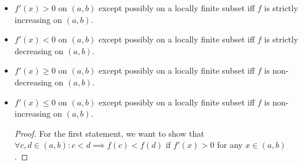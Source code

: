 \documentclass[a4paper,12pt]{report}
\begin{document}
\begin{itemize}
\begin{itemize}
If $f'(x)\geq g'(x)$ for all $x\in (a,b)$ with $b\in\bbR_{>a}\cup\{\infty\}$, and $f(a)=g(a)$, then $f(x)\geq g(x)$ for all $x\in(a,b]$.

If $f'(x)\geq g'(x)$ for all $x\in (a,b)$ with $b\in\bbR_{>a}\cup\{\infty\}$, $f$ is continuous on $(a,b]$, and $f(a)=g(a)$, then $f(x)\geq g(x)$ for all $x\in(a,b]$.
\begin{proof}
    For the first and second statements, define a function
    \[h(x)=f(x)-g(x).\]
    \[h'(x)=f'(x)-g'(x)>0,\quad\forall x\in(a,b).\]
    \[h(a)=f(a)-g(a)=0.\]
    By MVT, for all $x\in(a,b)$ for the first statement and $x\in(a,b]$ for the second statement, there exists $c\in(a,x)$ such that
    \[\frac{h(x)-h(a)}{x-a}=h'(c)>0.\]
    \[f(x)-g(x)=h(x)=(x-a)h'(c)>0.\]
    The other statements can be proven similarly.
\end{proof}
\subsubsection{Increasing/Decreasing and concavity extension}
If $f$ is strictly/weakly increasing/decreasing on an open interval $I$, and $f$ is continuous on a limit point $p$ of $I$, then $f$ is strictly/weakly increasing/decreasing on $I\cup\{p\}$.

If $f$ is strictly/weakly concave upward/downward on an open convex set $I$, and $f'$ is continuous on a set $J$ of limit points of $I$ such that $I\cup J$ is convex, then $f$ is strictly/weakly concave upward/downward on $I\cup J$.
\subsubsection{Increasing/Decreasing Test (I/D Test) Theorem}
Let function $f\colon I\subseteq\bbR\to\bbR$ be continuous on an open interval $(a,b)\subseteq I$ and differentiable on $(a,b)$ except possibly on a locally finite subset.
\bit
\item $f'(x)>0$ on $(a,b)$ except possibly on a locally finite subset iff $f$ is strictly increasing on $(a,b)$.
\item $f'(x)<0$ on $(a,b)$ except possibly on a locally finite subset iff $f$ is strictly decreasing on $(a,b)$.
\item $f'(x)\geq 0$ on $(a,b)$ except possibly on a locally finite subset iff $f$ is non-decreasing on $(a,b)$.
\item $f'(x)\leq 0$ on $(a,b)$ except possibly on a locally finite subset iff $f$ is non-increasing on $(a,b)$.
\eit
\begin{proof}
    For the first statement, we want to show that $\forall c,d\in (a,b)\colon c<d\implies f(c)<f(d)$ if $f'(x)>0$ for any $x\in (a,b)$.


\end{proof}
\end{itemize}
\end{itemize}
\end{document}
